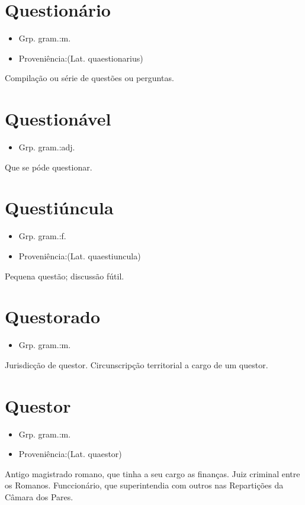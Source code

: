 \section{Questionário}
\begin{itemize}
\item {Grp. gram.:m.}
\end{itemize}
\begin{itemize}
\item {Proveniência:(Lat. \textunderscore quaestionarius\textunderscore )}
\end{itemize}
Compilação ou série de questões ou perguntas.
\section{Questionável}
\begin{itemize}
\item {Grp. gram.:adj.}
\end{itemize}
Que se póde questionar.
\section{Questiúncula}
\begin{itemize}
\item {Grp. gram.:f.}
\end{itemize}
\begin{itemize}
\item {Proveniência:(Lat. \textunderscore quaestiuncula\textunderscore )}
\end{itemize}
Pequena questão; discussão fútil.
\section{Questorado}
\begin{itemize}
\item {Grp. gram.:m.}
\end{itemize}
Jurisdicção de questor.
Circunscripção territorial a cargo de um questor.
\section{Questor}
\begin{itemize}
\item {Grp. gram.:m.}
\end{itemize}
\begin{itemize}
\item {Proveniência:(Lat. \textunderscore quaestor\textunderscore )}
\end{itemize}
Antigo magistrado romano, que tinha a seu cargo as finanças.
Juiz criminal entre os Romanos.
Funccionário, que superintendia com outros nas Repartições da Câmara dos Pares.
